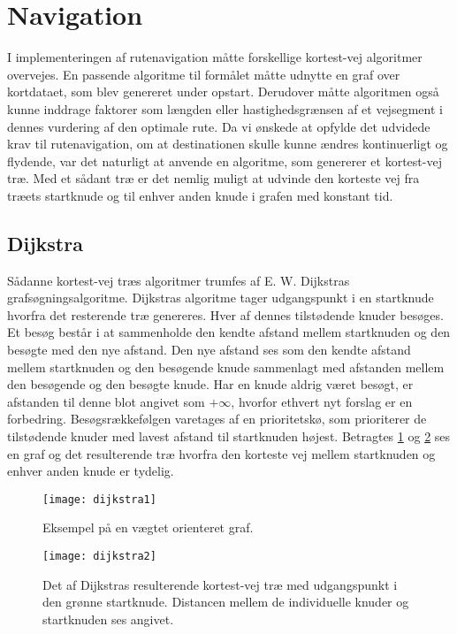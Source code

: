 \section{Navigation}
\label{sec:navigation}
I implementeringen af rutenavigation måtte forskellige kortest-vej algoritmer overvejes. En passende algoritme til formålet måtte udnytte en graf over kortdataet, som blev genereret under opstart. Derudover måtte algoritmen også kunne inddrage faktorer som længden eller hastighedsgrænsen af et vejsegment i dennes vurdering af den optimale rute. Da vi ønskede at opfylde det udvidede krav til rutenavigation, om at destinationen skulle kunne ændres kontinuerligt og flydende, var det naturligt at anvende en algoritme, som genererer et kortest-vej træ. Med et sådant træ er det nemlig muligt at udvinde den korteste vej fra træets startknude og til enhver anden knude i grafen med konstant tid.

\subsection{Dijkstra}
\label{subsec:dijkstra}
Sådanne kortest-vej træs algoritmer trumfes af E. W. Dijkstras grafsøgningsalgoritme. Dijkstras algoritme tager udgangspunkt i en startknude hvorfra det resterende træ genereres. Hver af dennes tilstødende knuder besøges. Et besøg består i at sammenholde den kendte afstand mellem startknuden og den besøgte med den nye afstand. Den nye afstand ses som den kendte afstand mellem startknuden og den besøgende knude sammenlagt med afstanden mellem den besøgende og den besøgte knude. Har en knude aldrig været besøgt, er afstanden til denne blot angivet som $+\infty$, hvorfor ethvert nyt forslag er en forbedring. Besøgsrækkefølgen varetages af en prioritetskø, som prioriterer de tilstødende knuder med lavest afstand til startknuden højest. Betragtes \ref{fig:dijkstra1} og \ref{fig:dijkstra2} ses en graf og det resulterende træ hvorfra den korteste vej mellem startknuden og enhver anden knude er tydelig.

\begin{figure}[ht]
	\centering
  \texttt{[image: dijkstra1]}
  \captionsetup{width=0.8\textwidth}
  \caption{Eksempel på en vægtet orienteret graf.}
  \label{fig:dijkstra1}
\end{figure}

\begin{figure}[ht]
	\centering
  \texttt{[image: dijkstra2]}
  \captionsetup{width=0.8\textwidth}
  \caption{Det af Dijkstras resulterende kortest-vej træ med udgangspunkt i den grønne startknude. Distancen mellem de individuelle knuder og startknuden ses angivet.}
  \label{fig:dijkstra2}
\end{figure}

